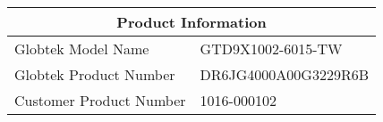 \begin{tabular}{p{7.5cm}p{7.5cm}}
\toprule
\multicolumn{2}{c}{\textbf{Product Information}} \\
\midrule
Globtek Model Name        & GTD9X1002-6015-TW \\
Globtek Product Number    & DR6JG4000A00G3229R6B \\
Customer Product Number   & 1016-000102 \\
\end{tabular}

